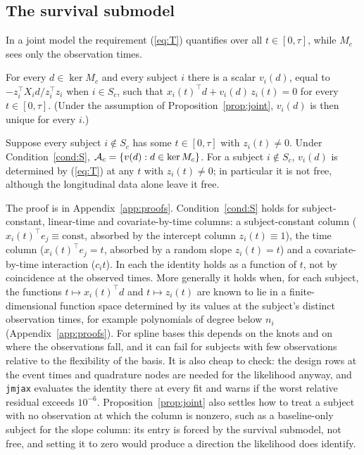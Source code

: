 \subsection{The survival submodel}

In a joint model the requirement (\ref{eq:T}) quantifies over all
$t \in [0, \tau]$, while $M_c$ sees only the observation times.

\begin{condition}\label{cond:S}
For every $d \in \ker M_c$ and every subject $i$ there is a scalar
$v_i(d)$, equal to $-z_i^{\top} X_i d / z_i^{\top} z_i$ when $i \in S_c$,
such that $x_i(t)^{\top} d + v_i(d)\, z_i(t) = 0$ for every $t \in [0,
\tau]$. (Under the assumption of Proposition~\ref{prop:joint}, $v_i(d)$ is
then unique for every $i$.)
\end{condition}

\begin{proposition}\label{prop:joint}
Suppose every subject $i \notin S_c$ has some $t \in [0, \tau]$ with
$z_i(t) \neq 0$. Under Condition~\ref{cond:S}, $\mathcal{A}_c = \{v(d) : d \in \ker
M_c\}$. For a subject $i \notin S_c$, $v_i(d)$ is determined by
(\ref{eq:T}) at any $t$ with $z_i(t) \neq 0$; in particular it is not
free, although the longitudinal data alone leave it free.
\end{proposition}

The proof is in Appendix~\ref{app:proofs}. Condition~\ref{cond:S} holds for subject-constant, linear-time and covariate-by-time columns: a subject-constant column
($x_i(t)^{\top}e_j \equiv \text{const}$, absorbed by the intercept column
$z_i(t) \equiv 1$), the time column ($x_i(t)^{\top}e_j = t$, absorbed by a
random slope $z_i(t) = t$) and a covariate-by-time interaction
($c_i t$). In each the identity holds as a function of $t$, not by
coincidence at the observed times. More generally it holds when, for each
subject, the functions $t \mapsto x_i(t)^{\top} d$ and $t \mapsto z_i(t)$
are known to lie in a finite-dimensional function space determined by its
values at the subject's distinct observation times, for example
polynomials of degree below $n_i$ (Appendix~\ref{app:proofs}). For spline
bases this depends on the knots and on where the observations fall, and
it can fail for subjects with few observations relative to the
flexibility of the basis. It is also cheap to check: the design rows at the event
times and quadrature nodes are needed for the likelihood anyway, and
\texttt{jmjax} evaluates the identity there at every fit and warns if the
worst relative residual exceeds $10^{-6}$. Proposition~\ref{prop:joint}
also settles how to treat a subject with no observation at which the
column is nonzero, such as a baseline-only subject for the slope column:
its entry is forced by the survival submodel, not free, and setting it to
zero would produce a direction the likelihood does identify.

